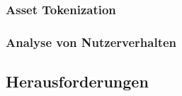 \subsubsection{Asset Tokenization}


\subsubsection{Analyse von Nutzerverhalten}




\subsection{Herausforderungen}



